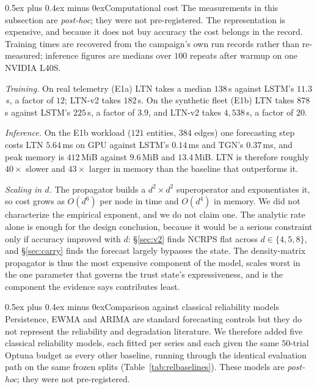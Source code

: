 \documentclass[journal]{IEEEtran}
\makeatletter
\def\subsection{\@startsection{subsection}{2}{\z@}{1.8ex plus 1ex minus 0.75ex}%
{0.5ex plus 0.4ex minus 0ex}{\normalfont\normalsize\itshape}}
\makeatother
\begin{document}
\subsection{Computational cost}\label{sec:cost}
The measurements in this subsection are \emph{post-hoc}; they were not pre-registered.
The representation is expensive, and because it does not buy accuracy the cost belongs
in the record. Training times are recovered from the campaign's own run records
rather than re-measured; inference figures are medians over $100$ repeats after
warmup on one NVIDIA L40S.

\emph{Training.} On real telemetry (E1a) LTN takes a median $138$\,s against LSTM's
$11.3$\,s, a factor of $12$; LTN-v2 takes $182$\,s. On the synthetic fleet (E1b) LTN
takes $878$\,s against LSTM's $225$\,s, a factor of $3.9$, and LTN-v2 takes
$4{,}538$\,s, a factor of $20$.

\emph{Inference.} On the E1b workload ($121$ entities, $384$ edges) one forecasting
step costs LTN $5.64$\,ms on GPU against LSTM's $0.14$\,ms and TGN's $0.37$\,ms, and
peak memory is $412$\,MiB against $9.6$\,MiB and $13.4$\,MiB. LTN is therefore
roughly $40\times$ slower and $43\times$ larger in memory than the baseline that
outperforms it.

\emph{Scaling in $d$.} The propagator builds a $d^2\!\times\!d^2$ superoperator and
exponentiates it, so cost grows as $O(d^6)$ per node in time and $O(d^4)$ in memory.
We did not characterize the empirical exponent, and we do not claim one. The
analytic rate alone is enough for the design conclusion, because it would be a
serious constraint only if accuracy improved with $d$: \S\ref{sec:v2} finds NCRPS
flat across $d\in\{4,5,8\}$, and \S\ref{sec:carry} finds the forecast largely
bypasses the state. The density-matrix propagator is thus the most expensive
component of the model, scales worst in the one parameter that governs the trust
state's expressiveness, and is the component the evidence says contributes least.

\subsection{Comparison against classical reliability
models}\label{sec:relbaselines}
Persistence, EWMA and ARIMA are standard forecasting controls but they do not
represent the reliability and degradation literature. We therefore added five
classical reliability models, each fitted per series and each given the same
$50$-trial Optuna budget as every other baseline, running through the identical
evaluation path on the same frozen splits (Table~\ref{tab:relbaselines}). These
models are \emph{post-hoc}; they were not pre-registered.
\end{document}
